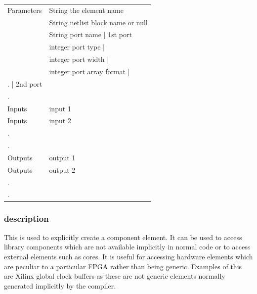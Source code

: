                 \begin{tabular}{| l | l |}
                \hline
                Parameters  & String  the element name               \\
                            & String  netlist block name or null     \\
                            & String    port name         | 1st port \\
                            & integer   port type         |          \\
                            & integer   port width        |          \\
                            & integer   port array format |          \\
                            .                             | 2nd port \\
                            .                                        \\
                \hline
                Inputs      & input 1                                \\
                Inputs      & input 2                                \\
                .                                                    \\
                .                                                    \\
                \hline
                Outputs     & output 1                               \\
                Outputs     & output 2                               \\
                .                                                    \\
                .                                                    \\
                \hline
                \end{tabular}

            \subsubsection{description}

                This is used to explicitly create a component element. It can be
                used to access library components which are not available
                implicitly in normal code or to access external elements such as
                cores. It is useful for accessing hardware elements which are
                peculiar to a particular FPGA rather than being generic.
                Examples of this are Xilinx global clock buffers as these are
                not generic elements normally generated implicitly by the
                compiler.

